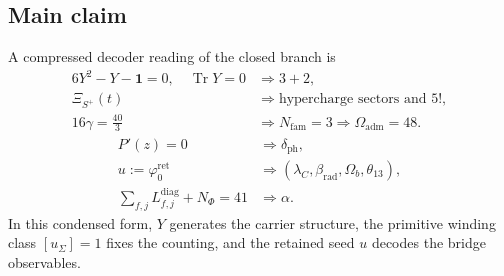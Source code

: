 \documentclass[11pt,a4paper]{article}
\theoremstyle{definition}
\theoremstyle{remark}
\DeclareMathOperator{\tr}{Tr}
\newcommand{\phiz}{\varphi_0^{\mathrm{ret}}}
\begin{document}
\subsection{Main claim}

A compressed decoder reading of the closed branch is
\[
\boxed{
\begin{aligned}
6Y^2-Y-\mathbf 1=0,\quad \tr Y=0
&\Rightarrow 3+2,\\
\Xi_{S^+}(t)
&\Rightarrow \text{hypercharge sectors and }5!,\\
16\gamma=\frac{40}{3}
&\Rightarrow N_{\mathrm{fam}}=3\Rightarrow \Omega_{\mathrm{adm}}=48.
\end{aligned}}
\]
\[
\boxed{
\begin{aligned}
P'(z)=0
&\Rightarrow \delta_{\mathrm{ph}},\\
u:=\phiz
&\Rightarrow (\lambda_C,\beta_{\mathrm{rad}},\Omega_b,\theta_{13}),\\
\sum_{f,j}L_{f,j}^{\mathrm{diag}}+N_\Phi=41
&\Rightarrow \alpha.
\end{aligned}}
\]
In this condensed form, $Y$ generates the carrier structure, the primitive winding class
$[u_\Sigma]=1$ fixes the counting, and the retained seed $u$ decodes the bridge observables.
\end{document}
